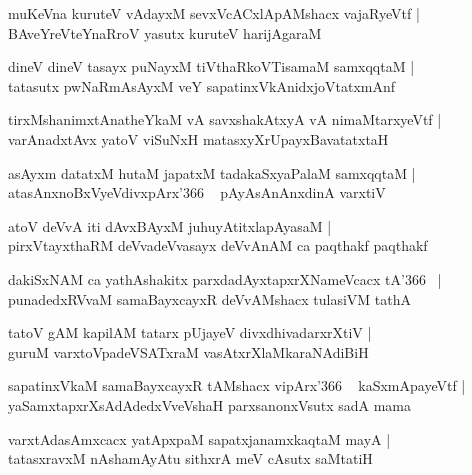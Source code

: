 \documentclass[twoside,12pt,openright]{book}
\newcounter{shloka}[chapter]
\begin{document}
\begin{shloka}%
muKeVna kuruteV vAdayxM sevxVcACxlApAMshacx vajaRyeVtf |\\
BAveYreVteYnaRroV yasutx kuruteV harijAgaraM 
\end{shloka}

\begin{shloka}%
dineV dineV tasayx puNayxM tiVthaRkoVTisamaM samxqqtaM |\\
tatasutx pwNaRmAsAyxM veY sapatinxVkAnidxjoVtatxmAnf 
\end{shloka}

\begin{shloka}%
tirxMshanimxtAnatheYkaM vA savxshakAtxyA vA nimaMtarxyeVtf |\\
varAnadxtAvx yatoV viSuNxH matasxyXrUpayxBavatatxtaH 
\end{shloka}

\begin{shloka}%
asAyxm datatxM hutaM japatxM tadakaSxyaPalaM samxqqtaM |\\
atasAnxnoBxVyeVdivxpArx\char'366 ~ pAyAsAnAnxdinA varxtiV 
\end{shloka}

\begin{shloka}%
atoV deVvA iti dAvxBAyxM juhuyAtitxlapAyasaM |\\
pirxVtayxthaRM deVvadeVvasayx deVvAnAM ca paqthakf paqthakf 
\end{shloka}

\begin{shloka}%
dakiSxNAM ca yathAshakitx parxdadAyxtapxrXNameVcacx tA\char'366 ~|\\
punadedxRVvaM samaBayxcayxR deVvAMshacx tulasiVM tathA 
\end{shloka}

\begin{shloka}%
tatoV gAM kapilAM tatarx pUjayeV divxdhivadarxrXtiV |\\
guruM varxtoVpadeVSATxraM vasAtxrXlaMkaraNAdiBiH 
\end{shloka}

\begin{shloka}%
sapatinxVkaM samaBayxcayxR tAMshacx vipArx\char'366 ~ kaSxmApayeVtf |\\
yaSamxtapxrXsAdAdedxVveVshaH parxsanonxVsutx sadA mama
\end{shloka}

\begin{shloka}%
varxtAdasAmxcacx yatApxpaM sapatxjanamxkaqtaM mayA |\\
tatasxravxM nAshamAyAtu sithxrA meV cAsutx saMtatiH 
\end{shloka}
\end{document}
